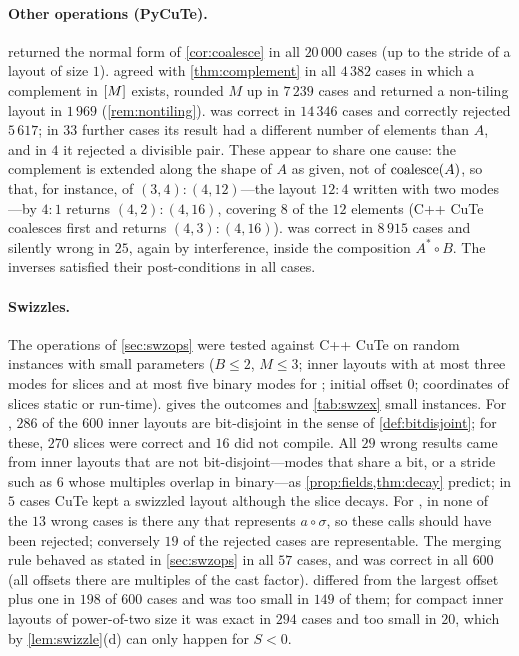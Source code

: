 \paragraph{Other operations (PyCuTe).}
 returned the normal form of \cref{cor:coalesce} in all $20\,000$ cases (up to
the stride of a layout of size $1$).  agreed with \cref{thm:complement} in all
$4\,382$ cases in which a complement in $[M]$ exists, rounded $M$ up in $7\,239$ cases and
returned a non-tiling layout in $1\,969$ (\cref{rem:nontiling}).  was correct
in $14\,346$ cases and correctly rejected $5\,617$; in $33$ further cases its result had a
different number of elements than $A$, and in $4$ it rejected a divisible pair. These appear to
share one cause: the complement is extended along the shape of $A$ as given, not of $\operatorname{coalesce}(A)$, so
that, for instance,  of $(3,4):(4,12)$---the layout $12:4$ written with two
modes---by $4:1$ returns $(4,2):(4,16)$, covering $8$ of the $12$ elements (C++ CuTe coalesces
first and returns $(4,3):(4,16)$). 
was correct in $8\,915$ cases and silently wrong in $25$, again by interference, inside the
composition $A^*\circ B$. The inverses satisfied their post-conditions in all cases.

\paragraph{Swizzles.}
The operations of \cref{sec:swzops} were tested against C++ CuTe on random instances with small
parameters ($B\le2$, $M\le3$; inner layouts with at most three modes for slices and at most five
binary modes for ; initial offset $0$; coordinates of slices static
or run-time).  gives the outcomes and
\cref{tab:swzex} small instances. For , $286$ of the $600$ inner layouts
are bit-disjoint in the sense of \cref{def:bitdisjoint}; for these, $270$ slices were correct and
$16$ did not compile. All $29$ wrong results came from inner layouts that are not
bit-disjoint---modes that share a bit, or a stride such as $6$ whose multiples overlap in
binary---as \cref{prop:fields,thm:decay} predict; in $5$ cases CuTe kept a swizzled layout
although the slice decays. For , in none of the $13$ wrong cases is
there any  that represents $a\circ\sigma$, so these calls should have been
rejected; conversely $19$ of the rejected cases are representable. The merging rule behaved as
stated in \cref{sec:swzops} in all $57$ cases, and  was correct in all $600$ (all
offsets there are multiples of the cast factor).  differed from the largest offset
plus one in $198$ of $600$ cases and was too small in $149$ of them; for compact inner layouts of
power-of-two size it was exact in $294$ cases and too small in $20$, which by
\cref{lem:swizzle}(d) can only happen for $S<0$.


